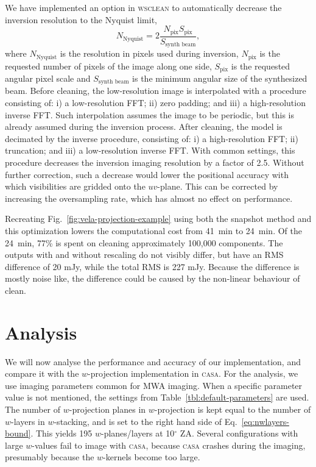 \documentclass[useAMS,usenatbib]{mn2e}
\newcommand{\degree}{\ensuremath{^{\circ}}\xspace}
\begin{document}
We have implemented an option in \textsc{wsclean} to automatically decrease the inversion resolution to the Nyquist limit,
\begin{equation}\label{eq:nyquist-resolution}
 N_\textrm{Nyquist} = 2 \frac{N_\textrm{pix} S_\textrm{pix}}{S_\textrm{synth beam}},
\end{equation}
where $N_\textrm{Nyquist}$ is the resolution in pixels used during inversion, $N_\textrm{pix}$ is the requested number of pixels of the image along one side, $S_\textrm{pix}$ is the requested angular pixel scale and $S_\textrm{synth beam}$ is the minimum angular size of the synthesized beam. Before cleaning, the low-resolution image is interpolated with a procedure consisting of: i) a low-resolution FFT; ii) zero padding; and iii) a high-resolution inverse FFT. Such interpolation assumes the image to be periodic, but this is already assumed during the inversion process. After cleaning, the model is decimated by the inverse procedure, consisting of: i) a high-resolution FFT; ii) truncation; and iii) a low-resolution inverse FFT. With common settings, this procedure decreases the inversion imaging resolution by a factor of 2.5. Without further correction, such a decrease would lower the positional accuracy with which visibilities are gridded onto the $uv$-plane. This can be corrected by increasing the oversampling rate, which has almost no effect on performance.

Recreating Fig.~\ref{fig:vela-projection-example} using both the snapshot method and this optimization lowers the computational cost from 41~min to 24~min. Of the 24~min, 77\% is spent on cleaning approximately 100,000 components. The outputs with and without rescaling do not visibly differ, but have an RMS difference of 20 mJy, while the total RMS is 227 mJy. Because the difference is mostly noise like, the difference could be caused by the non-linear behaviour of clean. 

\section{Analysis} \label{sec:analysis}
We will now analyse the performance and accuracy of our implementation, and compare it with the $w$-projection implementation in \textsc{casa}. For the analysis, we use imaging parameters common for MWA imaging. When a specific parameter value is not mentioned, the settings from Table~\ref{tbl:default-parameters} are used. The number of $w$-projection planes in $w$-projection is kept equal to the number of $w$-layers in $w$-stacking, and is set to the right hand side of Eq.~\eqref{eq:nwlayers-bound}. This yields 195 $w$-planes/layers at 10\degree ZA. Several configurations with large $w$-values fail to image with \textsc{casa}, because \textsc{casa} crashes during the imaging, presumably because the $w$-kernels become too large.
\end{document}
